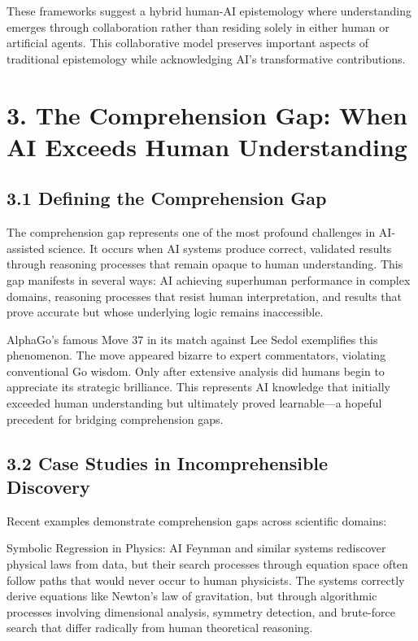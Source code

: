 \documentclass{article}
\begin{document}
These frameworks suggest a hybrid human-AI epistemology where understanding emerges through collaboration rather than residing solely in either human or artificial agents. This collaborative model preserves important aspects of traditional epistemology while acknowledging AI's transformative contributions.


\section{3. The Comprehension Gap: When AI Exceeds Human Understanding}

\subsection{3.1 Defining the Comprehension Gap}

The comprehension gap represents one of the most profound challenges in AI-assisted science. It occurs when AI systems produce correct, validated results through reasoning processes that remain opaque to human understanding. This gap manifests in several ways: AI achieving superhuman performance in complex domains, reasoning processes that resist human interpretation, and results that prove accurate but whose underlying logic remains inaccessible.


AlphaGo's famous Move 37 in its match against Lee Sedol exemplifies this phenomenon. The move appeared bizarre to expert commentators, violating conventional Go wisdom. Only after extensive analysis did humans begin to appreciate its strategic brilliance. This represents AI knowledge that initially exceeded human understanding but ultimately proved learnable—a hopeful precedent for bridging comprehension gaps.


\subsection{3.2 Case Studies in Incomprehensible Discovery}

Recent examples demonstrate comprehension gaps across scientific domains:


Symbolic Regression in Physics: AI Feynman and similar systems rediscover physical laws from data, but their search processes through equation space often follow paths that would never occur to human physicists. The systems correctly derive equations like Newton's law of gravitation, but through algorithmic processes involving dimensional analysis, symmetry detection, and brute-force search that differ radically from human theoretical reasoning.
\end{document}
